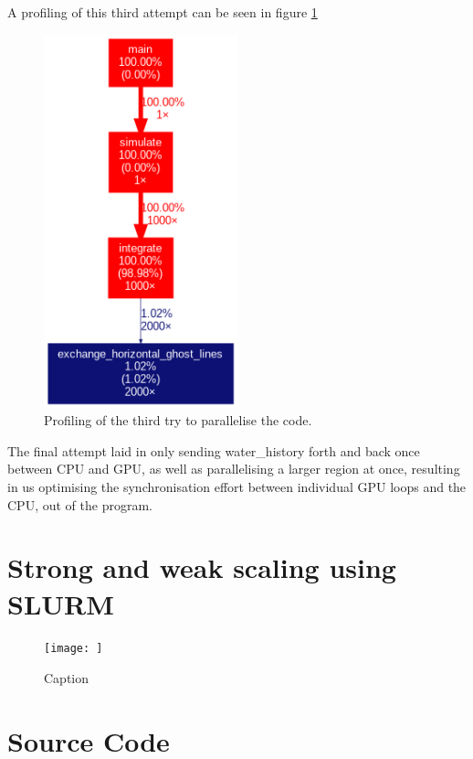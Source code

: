 \documentclass{article}
\begin{document}
A profiling of this third attempt can be seen in figure \ref{fig:profiling:thirdattempt}
\begin{figure}[h]
    \includegraphics[width=0.5\textwidth]{./figures/sequential_profile.png}
    \centering
    \caption{Profiling of the third try to parallelise the code. }
    \label{fig:profiling:thirdattempt}
\end{figure}

The final attempt laid in only sending water\_history forth and back once between CPU and GPU, as well as parallelising a larger region at once, resulting in us optimising the synchronisation effort between individual GPU loops and the CPU, out of the program. 

\section{Strong and weak scaling using SLURM}
\begin{figure}
    \centering
    \texttt{[image: ]}
    \caption{Caption}
    \label{fig:enter-label}
\end{figure}


\FloatBarrier
\section{Source Code}
\label{sec:source}

\end{document}
